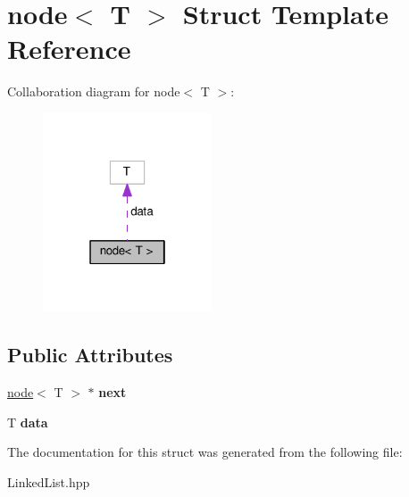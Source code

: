 \hypertarget{structnode}{}\section{node$<$ T $>$ Struct Template Reference}
\label{structnode}


Collaboration diagram for node$<$ T $>$\+:\nopagebreak
\begin{figure}[H]
\begin{center}
\leavevmode
\includegraphics[width=142pt]{structnode__coll__graph}
\end{center}
\end{figure}
\subsection*{Public Attributes}
\begin{DoxyCompactItemize}
\item 
\mbox{\label{structnode_ac96190e012822e6c053d2a5e9eedd68d}} 
\hyperlink{structnode}{node}$<$ T $>$ $\ast$ {\bfseries next}
\item 
\mbox{\label{structnode_a0a3e961e5caf1562f0c27caef3940e7a}} 
T {\bfseries data}
\end{DoxyCompactItemize}


The documentation for this struct was generated from the following file\+:\begin{DoxyCompactItemize}
\item 
Linked\+List.\+hpp\end{DoxyCompactItemize}

